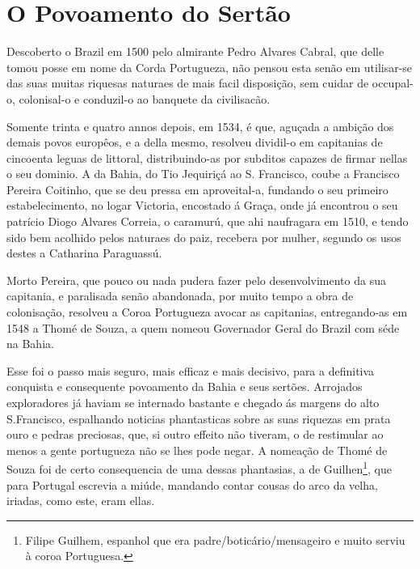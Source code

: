 \chapter{O Povoamento do Sertão}

Descoberto o Brazil em 1500 pelo almirante Pedro Alvares Cabral, que delle tomou posse
em nome da Corda Portugueza, não pensou esta senão em utilisar-se das suas muitas riquesas naturaes de mais facil disposição, sem cuidar de occupal-o, colonisal-o e conduzil-o ao banquete da civilisacão.

Somente trinta e quatro annos depois, em 1534, é que, aguçada a ambição dos demais
povos europêos, e a della mesmo, resolveu dividil-o em capitanias de cincoenta leguas de littoral, distribuindo-as por subditos capazes de firmar nellas o seu dominio. A da Bahia, do Tio Jequiriçá ao S. Francisco, coube a Francisco Pereira Coitinho, que se deu pressa em aproveital-a, fundando o seu primeiro estabelecimento, no logar Victoria, encostado á Graça, onde já encontrou o seu patrício Diogo Alvares Correia, o caramurú, que ahi naufragara  em 1510, e  tendo sido bem acolhido pelos naturaes do paiz, recebera por mulher, segundo  os usos  destes a Catharina Paraguassú.

Morto Pereira, que pouco ou nada pudera fazer pelo desenvolvimento da sua capitania, e paralisada senão abandonada, por muito tempo a obra de colonisação, resolveu a Coroa Portugueza avocar as capitanias, entregando-as em 1548 a Thomé de Souza, a quem nomeou Governador Geral do Brazil com séde na Bahia.

Esse foi o passo mais  seguro, mais efficaz e mais decisivo, para a definitiva conquista e  consequente povoamento da Bahia e seus sertões.  Arrojados exploradores já haviam se internado bastante e chegado ás margens do alto S.Francisco, espalhando noticias phantasticas sobre as suas riquezas em prata ouro e pedras preciosas, que, si outro effeito não tiveram, o de restimular ao menos a gente portugueza não se lhes pode negar. A nomeação de Thomé de Souza foi de certo consequencia de uma dessas phantasias, a de  Guilhen\footnote{Filipe Guilhem, espanhol que era padre/boticário/mensageiro e muito serviu à coroa Portuguesa.}, %
que para Portugal escrevia a miúde, mandando contar  cousas do arco da velha, iriadas, como este, eram ellas.

